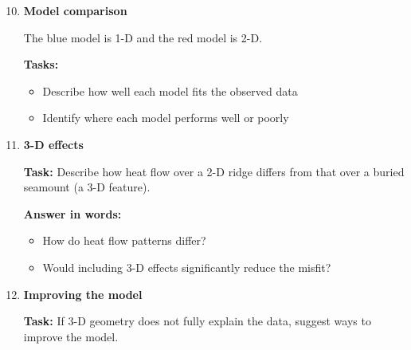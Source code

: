 \documentclass[final,a4paper,12pt]{article}
\begin{document}
\begin{enumerate}
\setcounter{enumi}{9}

\item \textbf{Model comparison}

The blue model is 1-D and the red model is 2-D.

\textbf{Tasks:}
\begin{itemize}
    \item Describe how well each model fits the observed data
    \item Identify where each model performs well or poorly
\end{itemize}

\bigskip

\item \textbf{3-D effects}

\textbf{Task:} Describe how heat flow over a 2-D ridge differs from that over a
buried seamount (a 3-D feature).

\textbf{Answer in words:}
\begin{itemize}
    \item How do heat flow patterns differ?
    \item Would including 3-D effects significantly reduce the misfit?
\end{itemize}

\bigskip

\item \textbf{Improving the model}

\textbf{Task:} If 3-D geometry does not fully explain the data, suggest ways to
improve the model.

\end{enumerate}
\end{document}
